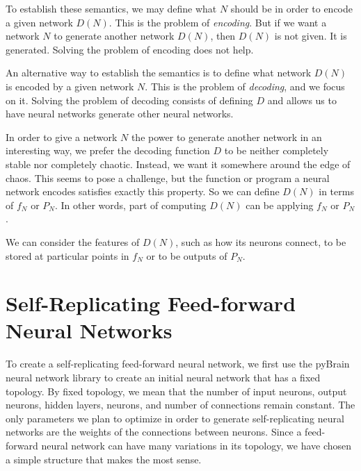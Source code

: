 \documentclass[12pt]{article}
\newcommand{\term}[1]{\emph{#1}}
\begin{document}
To establish these semantics,
we may define what $N$ should be
in order to encode a given network $D(N)$.
This is the problem of \term{encoding}.
But if we want a network $N$
to generate another network $D(N)$,
then $D(N)$ is not given.
It is generated.
Solving the problem of encoding does not help.

An alternative way to establish the semantics
is to define what network $D(N)$ is encoded
by a given network $N$.
This is the problem of \term{decoding},
and we focus on it.
Solving the problem of decoding
consists of defining $D$
and allows us to have neural networks
generate other neural networks.

In order to give a network $N$
the power to generate another network
in an interesting way,
we prefer the decoding function $D$
to be neither completely stable
nor completely chaotic.
Instead, we want it somewhere around the edge of chaos.%
\cite{langton1990edgechaos}
This seems to pose a challenge,
but the function or program a neural network encodes
satisfies exactly this property.
So we can define $D(N)$ in terms of $f_N$ or $P_N$.
In other words, part of computing $D(N)$
can be applying $f_N$ or $P_N$.

We can consider the features of $D(N)$,
such as how its neurons connect,
to be stored at particular points
in $f_N$
or to be outputs of $P_N$.

\section{Self-Replicating Feed-forward Neural Networks}
\label{feedforward}

To create a self-replicating feed-forward neural network, we first use the pyBrain neural network library \cite{schaul2010} to create an initial neural network that has a fixed topology. By fixed topology, we mean that the number of input neurons, output neurons, hidden layers, neurons, and number of connections remain constant. The only parameters we plan to optimize in order to generate self-replicating neural networks are  the weights of the connections between neurons. Since a feed-forward neural network can have many variations in its topology, we have chosen a simple structure that makes the most sense. 
\end{document}
